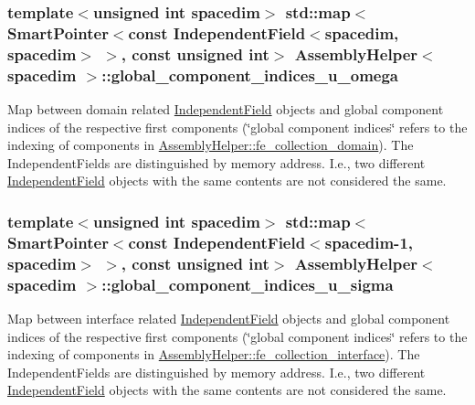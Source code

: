 \subsubsection[{\texorpdfstring{global\+\_\+component\+\_\+indices\+\_\+u\+\_\+omega}{global_component_indices_u_omega}}]{\setlength{\rightskip}{0pt plus 5cm}template$<$unsigned int spacedim$>$ std\+::map$<${\bf Smart\+Pointer}$<$const {\bf Independent\+Field}$<$spacedim, spacedim$>$ $>$, const unsigned int$>$ {\bf Assembly\+Helper}$<$ spacedim $>$\+::global\+\_\+component\+\_\+indices\+\_\+u\+\_\+omega\hspace{0.3cm}{\ttfamily [private]}}\hypertarget{class_assembly_helper_a6dae4b6ae7934eaec1ad7baff258ce6e}{}\label{class_assembly_helper_a6dae4b6ae7934eaec1ad7baff258ce6e}
Map between domain related \hyperlink{class_independent_field}{Independent\+Field} objects and global component indices of the respective first components (\char`\"{}global component indices\char`\"{} refers to the indexing of components in \hyperlink{class_assembly_helper_af3803b0aad9853e6bf018c70be41e791}{Assembly\+Helper\+::fe\+\_\+collection\+\_\+domain}). The Independent\+Fields are distinguished by memory address. I.\+e., two different \hyperlink{class_independent_field}{Independent\+Field} objects with the same contents are not considered the same. 
\subsubsection[{\texorpdfstring{global\+\_\+component\+\_\+indices\+\_\+u\+\_\+sigma}{global_component_indices_u_sigma}}]{\setlength{\rightskip}{0pt plus 5cm}template$<$unsigned int spacedim$>$ std\+::map$<${\bf Smart\+Pointer}$<$const {\bf Independent\+Field}$<$spacedim-\/1, spacedim$>$ $>$, const unsigned int$>$ {\bf Assembly\+Helper}$<$ spacedim $>$\+::global\+\_\+component\+\_\+indices\+\_\+u\+\_\+sigma\hspace{0.3cm}{\ttfamily [private]}}\hypertarget{class_assembly_helper_a992a53a1fcac8a393ca53fb8d504bdfe}{}\label{class_assembly_helper_a992a53a1fcac8a393ca53fb8d504bdfe}
Map between interface related \hyperlink{class_independent_field}{Independent\+Field} objects and global component indices of the respective first components (\char`\"{}global component indices\char`\"{} refers to the indexing of components in \hyperlink{class_assembly_helper_a8b4d224a9ecd2e926a8860829874d2a1}{Assembly\+Helper\+::fe\+\_\+collection\+\_\+interface}). The Independent\+Fields are distinguished by memory address. I.\+e., two different \hyperlink{class_independent_field}{Independent\+Field} objects with the same contents are not considered the same. 
